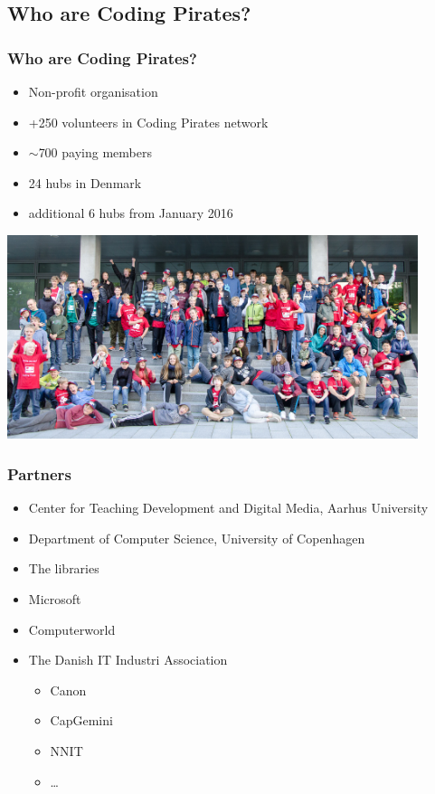 \documentclass{beamer}
\begin{document}
\subsection{Who are Coding Pirates?}
\begin{frame}
\frametitle{Who are Coding Pirates?}
\begin{itemize}
\item Non-profit organisation
\item +250 volunteers in Coding Pirates network
\item $\sim$700 paying members
\item 24 hubs in Denmark
\item additional 6 hubs from January 2016
\end{itemize}

\centerline{\includegraphics[width=0.9\textwidth]{imagery/gamejam}}
\end{frame}

\begin{frame}
  \frametitle{Partners}

\begin{itemize}
\item Center for Teaching Development and Digital Media, Aarhus
  University
\item Department of Computer Science, University of Copenhagen
\item The libraries
\item Microsoft
\item Computerworld
\item The Danish IT Industri Association
  \begin{itemize}
  \item Canon
  \item CapGemini
  \item NNIT
  \item \ldots
  \end{itemize}
\end{itemize}
\end{frame}
\end{document}
